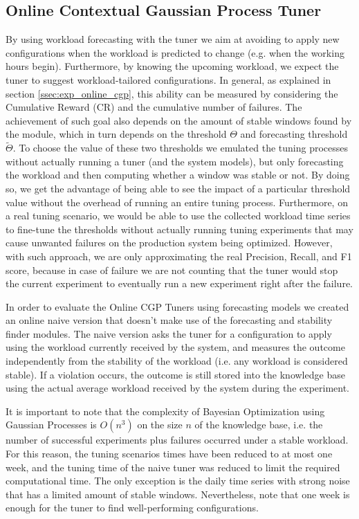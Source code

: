 \documentclass[a4paper, 12pt]{article} %
\begin{document}
	
	
	\subsection{Online Contextual Gaussian Process Tuner} \label{ssec:results_online_cgp_tuner}
	By using workload forecasting with the tuner we aim at avoiding to apply new configurations when the workload is predicted to change (e.g. when the working hours begin). Furthermore, by knowing the upcoming workload, we expect the tuner to suggest workload-tailored configurations. In general, as explained in section \ref{ssec:exp_online_cgp}, this ability can be measured by considering the Cumulative Reward (CR) and the cumulative number of failures.
	The achievement of such goal also depends on the amount of stable windows found by the module, which in turn depends on the threshold $\Theta$ and forecasting threshold $\tilde{\Theta}$. To choose the value of these two thresholds we emulated the tuning processes without actually running a tuner (and the system models), but only forecasting the workload and then computing whether a window was stable or not. By doing so, we get the advantage of being able to see the impact of a particular threshold value without the overhead of running an entire tuning process. Furthermore, on a real tuning scenario, we would be able to use the collected workload time series to fine-tune the thresholds without actually running tuning experiments that may cause unwanted failures on the production system being optimized. However, with such approach, we are only approximating the real Precision, Recall, and F1 score, because in case of failure we are not counting that the tuner would stop the current experiment to eventually run a new experiment right after the failure.
	
	In order to evaluate the Online CGP Tuners using forecasting models we created an online naive version that doesn't make use of the forecasting and stability finder modules. The naive version asks the tuner for a configuration to apply using the workload currently received by the system, and measures the outcome independently from the stability of the workload (i.e. any workload is considered stable). If a violation occurs, the outcome is still stored into the knowledge base using the actual average workload received by the system during the experiment.
	
	It is important to note that the complexity of Bayesian Optimization using Gaussian Processes is $O(n^3)$ on the size $n$ of the knowledge base, i.e. the number of successful experiments plus failures occurred under a stable workload. For this reason, the tuning scenarios times have been reduced to at most one week, and the tuning time of the naive tuner was reduced to limit the required computational time. The only exception is the daily time series with strong noise that has a limited amount of stable windows. Nevertheless, note that one week is enough for the tuner to find well-performing configurations. 
	
\end{document}
